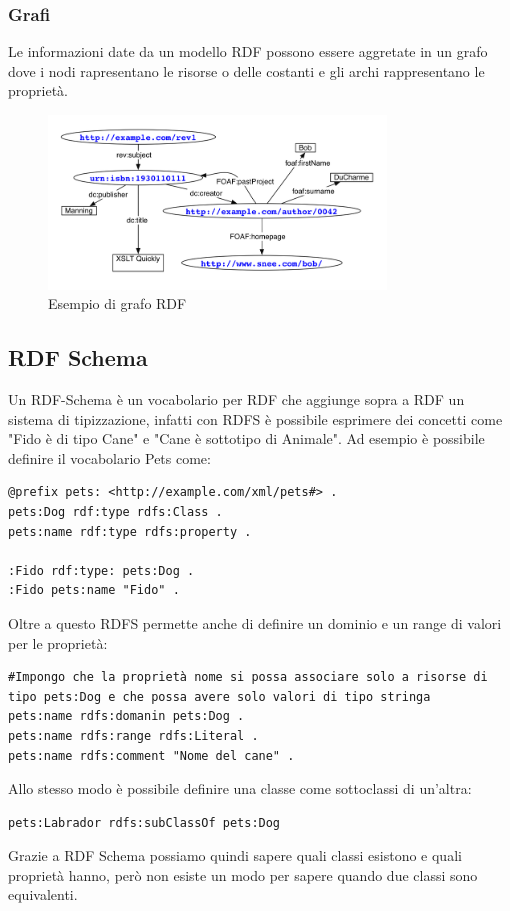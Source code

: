 \subsubsection{Grafi}
Le informazioni date da un modello RDF possono essere aggretate in un grafo dove i nodi rapresentano le risorse o delle costanti e gli archi rappresentano le proprietà.
\begin{figure}
\centering
\includegraphics[width=0.8\textwidth]{images/sample_graph.png}
\caption{Esempio di grafo RDF}\label{fig:1}
\end{figure}

\subsection{RDF Schema}
Un RDF-Schema è un vocabolario per RDF che aggiunge sopra a RDF un sistema di tipizzazione, infatti con RDFS è possibile esprimere dei concetti come "Fido è di tipo Cane" e "Cane è sottotipo di Animale".
Ad esempio è possibile definire il vocabolario Pets come:
\begin{lstlisting}
@prefix pets: <http://example.com/xml/pets#> .
pets:Dog rdf:type rdfs:Class .
pets:name rdf:type rdfs:property .

:Fido rdf:type: pets:Dog .
:Fido pets:name "Fido" .
\end{lstlisting}
Oltre a questo RDFS permette anche di definire un dominio e un range di valori per le proprietà:
\begin{lstlisting}
#Impongo che la proprietà nome si possa associare solo a risorse di tipo pets:Dog e che possa avere solo valori di tipo stringa
pets:name rdfs:domanin pets:Dog .
pets:name rdfs:range rdfs:Literal .
pets:name rdfs:comment "Nome del cane" .
\end{lstlisting}
Allo stesso modo è possibile definire una classe come sottoclassi di un'altra:
\begin{lstlisting}
pets:Labrador rdfs:subClassOf pets:Dog
\end{lstlisting}
Grazie a RDF Schema possiamo quindi sapere quali classi esistono e quali proprietà hanno, però non esiste un modo per sapere quando due classi sono equivalenti.

